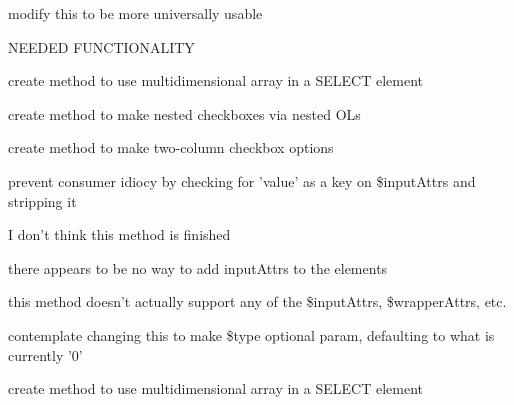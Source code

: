 
\begin{DoxyRefList}
\item[\label{todo__todo000001}%
\hypertarget{todo__todo000001}{}%
Global \hyperlink{class_c_r_u_dadmin_p_d_o_ad7987609659b16267a44981bd5e64b3a}{C\-R\-U\-Dadmin\-P\-D\-O\-:\-:admin\-Table} (\$fields= '$\ast$ ', \$criteria\-Field= 'deleted', \$criteria\-Value= '0', \$extras=null, \$order\-By=null, \$order\-Dir= 'A\-S\-C', \$limit=null)]modify this to be more universally usable 
\item[\label{todo__todo000002}%
\hypertarget{todo__todo000002}{}%
Class \hyperlink{class_files}{Files} ]N\-E\-E\-D\-E\-D F\-U\-N\-C\-T\-I\-O\-N\-A\-L\-I\-T\-Y 
\item[\label{todo__todo000003}%
\hypertarget{todo__todo000003}{}%
Class \hyperlink{classg_form}{g\-Form} ]create method to use multidimensional array in a S\-E\-L\-E\-C\-T element 

create method to make nested checkboxes via nested O\-Ls 

create method to make two-\/column checkbox options 

prevent consumer idiocy by checking for 'value' as a key on \$input\-Attrs and stripping it 
\item[\label{todo__todo000006}%
\hypertarget{todo__todo000006}{}%
Global \hyperlink{classg_form_a83c6bbcee34e89edaf5981a1eda2da2b}{g\-Form\-:\-:checkbox\-Nested} (\$varname, \$value\-\_\-array, \$method=null, \$display=\char`\"{}block\char`\"{}, \$input\-Attrs=null, \$wrapper\-Attrs=null, \$label\-Attrs=null)]I don't think this method is finished 
\item[\label{todo__todo000004}%
\hypertarget{todo__todo000004}{}%
Global \hyperlink{classg_form_a9d6a45eabcab3b8a17165663cec6e513}{g\-Form\-:\-:date\-Drop\-Set} (\$label, \$settings, \$varname, \$wrapper\-Attrs=null, \$label\-Attrs=null, \$post\-String= '')]there appears to be no way to add input\-Attrs to the elements 
\item[\label{todo__todo000005}%
\hypertarget{todo__todo000005}{}%
Global \hyperlink{classg_form_a283b3ac490709e2a0776e9c6472efa96}{g\-Form\-:\-:hiddenbox} (\$varname, \$varvalue, \$input\-Attrs=null, \$wrapper\-Attrs=null)]this method doesn't actually support any of the \$input\-Attrs, \$wrapper\-Attrs, etc. 
\item[\label{todo__todo000007}%
\hypertarget{todo__todo000007}{}%
Global \hyperlink{classg_form_aa78e310c19c791e6698ced6cd851811d}{g\-Form\-:\-:validate} (\$type, \$var, \$msg, \$param=null, \$param2=null)]contemplate changing this to make \$type optional param, defaulting to what is currently '0' 
\item[\label{todo__todo000008}%
\hypertarget{todo__todo000008}{}%
Class \hyperlink{classg_form_boot_strap}{g\-Form\-Boot\-Strap} ]create method to use multidimensional array in a S\-E\-L\-E\-C\-T element 


\end{DoxyRefList}
